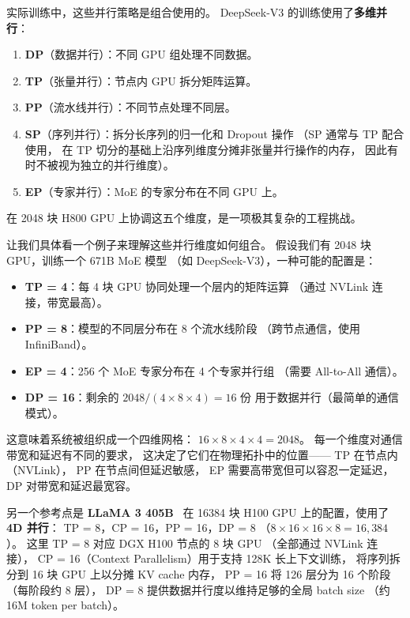 实际训练中，这些并行策略是组合使用的。
DeepSeek-V3 的训练使用了\textbf{多维并行}：
\begin{enumerate}[noitemsep]
  \item \textbf{DP}（数据并行）：不同 GPU 组处理不同数据。
  \item \textbf{TP}（张量并行）：节点内 GPU 拆分矩阵运算。
  \item \textbf{PP}（流水线并行）：不同节点处理不同层。
  \item \textbf{SP}（序列并行）：拆分长序列的归一化和 Dropout 操作
        （SP 通常与 TP 配合使用，
        在 TP 切分的基础上沿序列维度分摊非张量并行操作的内存，
        因此有时不被视为独立的并行维度）。
  \item \textbf{EP}（专家并行）：MoE 的专家分布在不同 GPU 上。
\end{enumerate}

在 2048 块 H800 GPU 上协调这五个维度，是一项极其复杂的工程挑战。

让我们具体看一个例子来理解这些并行维度如何组合。
假设我们有 2048 块 GPU，训练一个 671B MoE 模型
（如 DeepSeek-V3），一种可能的配置是：
\begin{itemize}[noitemsep]
  \item \textbf{TP = 4}：每 4 块 GPU 协同处理一个层内的矩阵运算
        （通过 NVLink 连接，带宽最高）。
  \item \textbf{PP = 8}：模型的不同层分布在 8 个流水线阶段
        （跨节点通信，使用 InfiniBand）。
  \item \textbf{EP = 4}：256 个 MoE 专家分布在 4 个专家并行组
        （需要 All-to-All 通信）。
  \item \textbf{DP = 16}：剩余的 $2048 / (4 \times 8 \times 4) = 16$ 份
        用于数据并行（最简单的通信模式）。
\end{itemize}

这意味着系统被组织成一个四维网格：
$16 \times 8 \times 4 \times 4 = 2048$。
每一个维度对通信带宽和延迟有不同的要求，
这决定了它们在物理拓扑中的位置——
TP 在节点内（NVLink），
PP 在节点间但延迟敏感，
EP 需要高带宽但可以容忍一定延迟，
DP 对带宽和延迟最宽容。

另一个参考点是 \textbf{LLaMA 3 405B}~\cite{dubey2024llama3}
在 16384 块 H100 GPU 上的配置，使用了 \textbf{4D 并行}：
TP = 8，CP = 16，PP = 16，DP = 8
（$8 \times 16 \times 16 \times 8 = 16{,}384$）。
这里 TP = 8 对应 DGX H100 节点的 8 块 GPU
（全部通过 NVLink 连接），
CP = 16（Context Parallelism）用于支持 128K 长上下文训练，
将序列拆分到 16 块 GPU 上以分摊 KV cache 内存，
PP = 16 将 126 层分为 16 个阶段（每阶段约 8 层），
DP = 8 提供数据并行度以维持足够的全局 batch size
（约 16M token per batch）。

